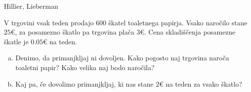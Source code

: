 \begin{naloga}{Hillier, Lieberman}{\cite[Problem~19.3-2]{hl}}
\begin{vprasanje}
V trgovini vsak teden prodajo $600$ škatel toaletnega papirja.
Vsako naročilo stane $25 €$, za posamezno škatlo pa trgovina plača $3 €$.
Cena skladiščenja posamezne škatle je $0.05 €$ na teden.
\begin{enumerate}[(a)]
\item Denimo, da primanjkljaj ni dovoljen.
Kako pogosto naj trgovina naroča toaletni papir?
Kako velika naj bodo naročila?
\item Kaj pa, če dovolimo primanjkljaj,
ki nas stane $2 €$ na teden za vsako škatlo?
\end{enumerate}

\end{vprasanje}
\begin{odgovor}
\end{odgovor}
\end{naloga}

